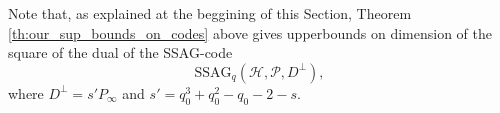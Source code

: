 \documentclass[a4paper]{article}
\newtheorem{coro1}{Corollary}
\newcommand{\calP}{\mathcal{P}}
\newcommand{\calH}{\mathcal{H}}
\begin{document}
Note that, as explained at the beggining of this Section, Theorem \ref{th:our_sup_bounds_on_codes} above gives upperbounds on dimension of the square of the dual of the \textrm{SSAG}-code
\[\mathrm{SSAG}_{q}(\calH,\calP,D^{\perp}),\]
where $D^{\perp} = s' P_{\infty}$ and $s'= q_0^3+q_0^2-q_0-2-s$.



\clearpage


\end{document}
